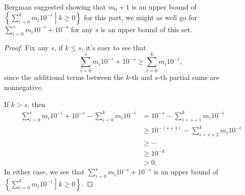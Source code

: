 \documentclass[../../../main.tex]{subfiles}
\begin{document}

Bergman suggested showing that $m_0 + 1$ is an upper bound of $\left\{\sum_{i=0}^{k} m_i10^{-i} \middle| k \geq 0 \right\}$ for this part, we might as well go for $\sum_{i=0}^{s} m_i 10^{-i} + 10^{-s}$ for any $s$ is an upper bound of this set.

\begin{proof}
	Fix any $s$, if $k \leq s$, it's easy to see that
	\[ 
		\sum_{i=0}^{s} m_i 10^{-i} + 10^{-s} \geq \sum_{i=0}^{k} m_i10^{-i},
	 \]
	since the additional terms between the $k$-th and $s$-th partial sums are nonnegative.

	If $k > s$, then
	\[
		\begin{aligned}
		\sum_{i=0}^{s} m_i 10^{-i} + 10^{-s}
		- \sum_{i=0}^{k} m_i 10^{-i}
		&= 10^{-s} - \sum_{i=s+1}^{k} m_i 10^{-i} \\
		&\geq 10^{-(s+1)} - \sum_{i=s+2}^{k} m_i 10^{-i} \\
		&\geq \cdots \\
		&\geq 10^{-k} \\
		&> 0.
		\end{aligned}
	\]
	In either case, we see that $\sum_{i=0}^{s} m_i 10^{-i} + 10^{-s}$ is an upper bound of $\left\{\sum_{i=0}^{k} m_i10^{-i} \middle| k \geq 0 \right\}$.


\end{proof}
\end{document}
